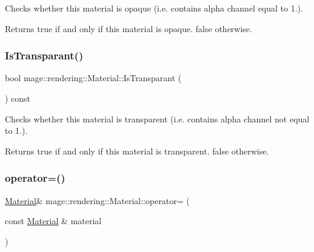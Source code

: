 Checks whether this material is opaque (i.\+e. contains alpha channel equal to 1.).

\begin{DoxyReturn}{Returns}
{\ttfamily true} if and only if this material is opaque. {\ttfamily false} otherwise. 
\end{DoxyReturn}
\hypertarget{classmage_1_1rendering_1_1_material_ae60d1b61ebd38d3e329a519b2f2c3dad}{}\label{classmage_1_1rendering_1_1_material_ae60d1b61ebd38d3e329a519b2f2c3dad} 
\subsubsection{\texorpdfstring{Is\+Transparant()}{IsTransparant()}}
{\footnotesize\ttfamily bool mage\+::rendering\+::\+Material\+::\+Is\+Transparant (\begin{DoxyParamCaption}{ }\end{DoxyParamCaption}) const\hspace{0.3cm}{\ttfamily [noexcept]}}

Checks whether this material is transparent (i.\+e. contains alpha channel not equal to 1.).

\begin{DoxyReturn}{Returns}
{\ttfamily true} if and only if this material is transparent. {\ttfamily false} otherwise. 
\end{DoxyReturn}
\hypertarget{classmage_1_1rendering_1_1_material_a535022bb3c1264412278337fc3d5d717}{}\label{classmage_1_1rendering_1_1_material_a535022bb3c1264412278337fc3d5d717} 
\subsubsection{\texorpdfstring{operator=()}{operator=()}\hspace{0.1cm}{\footnotesize\ttfamily [1/2]}}
{\footnotesize\ttfamily \hyperlink{classmage_1_1rendering_1_1_material}{Material}\& mage\+::rendering\+::\+Material\+::operator= (\begin{DoxyParamCaption}\item[{const \hyperlink{classmage_1_1rendering_1_1_material}{Material} \&}]{material }\end{DoxyParamCaption})\hspace{0.3cm}{\ttfamily [default]}}

